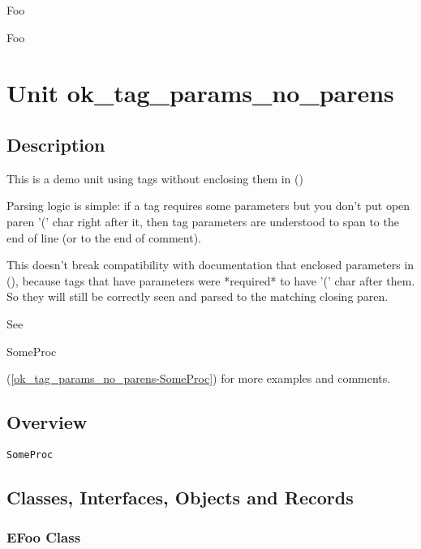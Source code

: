 \documentclass{report}
\newif\ifpdf
\begin{document}
\begin{ttfamily}Foo\end{ttfamily}

\begin{ttfamily}Foo\end{ttfamily}
\chapter{Unit ok{\_}tag{\_}params{\_}no{\_}parens}
\label{ok_tag_params_no_parens}
\section{Description}
This is a demo unit using tags without enclosing them in ()\hfill\vspace*{1ex}



Parsing logic is simple: if a tag requires some parameters but you don't put open paren '(' char right after it, then tag parameters are understood to span to the end of line (or to the end of comment).

This doesn't break compatibility with documentation that enclosed parameters in (), because tags that have parameters were *required* to have '(' char after them. So they will still be correctly seen and parsed to the matching closing paren.

See \begin{ttfamily}SomeProc\end{ttfamily}(\ref{ok_tag_params_no_parens-SomeProc}) for more examples and comments.

   
\section{Overview}
\begin{description}
\item[\texttt{\begin{ttfamily}EFoo\end{ttfamily} Class}]
\end{description}
\begin{description}
\item[\texttt{SomeProc}]
\end{description}
\section{Classes, Interfaces, Objects and Records}
\ifpdf
\subsection*{\large{\textbf{EFoo Class}}\normalsize\hspace{1ex}\hrulefill}
\else
\end{document}
